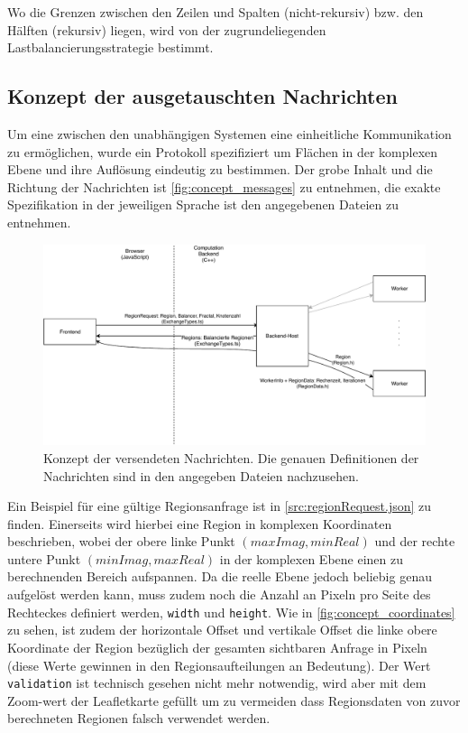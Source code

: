 Wo die Grenzen zwischen den Zeilen und Spalten (nicht-rekursiv) bzw. den Hälften (rekursiv) liegen, wird von der zugrundeliegenden Lastbalancierungsstrategie bestimmt.

\subsection{Konzept der ausgetauschten Nachrichten}

Um eine zwischen den unabhängigen Systemen eine einheitliche Kommunikation zu ermöglichen,
wurde ein Protokoll spezifiziert um Flächen in der komplexen Ebene und ihre Auflösung eindeutig zu bestimmen.
Der grobe Inhalt und die Richtung der Nachrichten ist \autoref{fig:concept_messages} zu entnehmen,
die exakte Spezifikation in der jeweiligen Sprache ist den angegebenen Dateien zu entnehmen.

\begin{figure}
	\includegraphics[width=0.9\linewidth]{img/Implementierung/Nachrichtenuebersicht.pdf}
	\caption{Konzept der versendeten Nachrichten. Die genauen Definitionen der Nachrichten sind in den angegeben Dateien nachzusehen.}
	\label{fig:concept_messages}
\end{figure}


Ein Beispiel für eine gültige Regionsanfrage ist in \autoref{src:regionRequest.json} zu finden.
Einerseits wird hierbei eine Region in komplexen Koordinaten beschrieben, wobei der obere linke Punkt $(maxImag, minReal)$
und der rechte untere Punkt $(minImag, maxReal)$ in der komplexen Ebene einen zu berechnenden Bereich aufspannen.
Da die reelle Ebene jedoch beliebig genau aufgelöst werden kann, muss zudem noch die Anzahl an Pixeln
pro Seite des Rechteckes definiert werden, \verb|width| und \verb|height|.
Wie in \autoref{fig:concept_coordinates} zu sehen, ist zudem der horizontale Offset und vertikale Offset
die linke obere Koordinate der Region bezüglich der gesamten sichtbaren Anfrage in Pixeln (diese Werte
gewinnen in den Regionsaufteilungen an Bedeutung).
Der Wert \verb|validation| ist technisch gesehen nicht mehr notwendig, wird aber mit dem Zoom-wert der Leafletkarte gefüllt
um zu vermeiden dass Regionsdaten von zuvor berechneten Regionen falsch verwendet werden.

